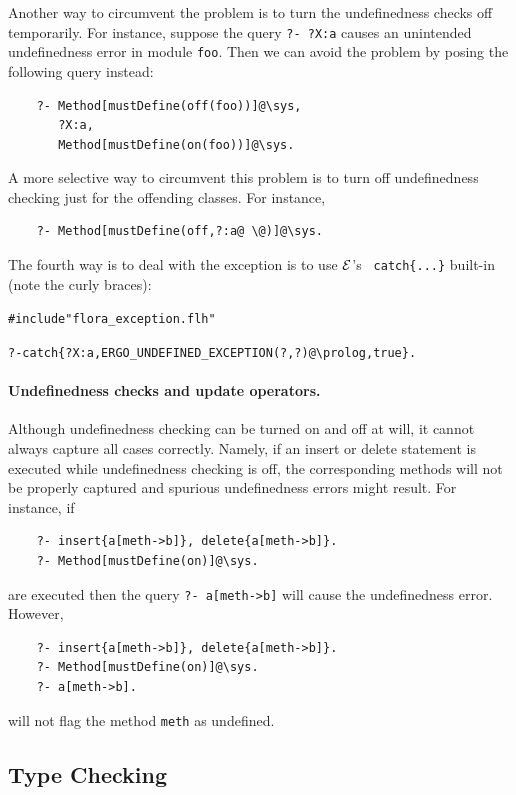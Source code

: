 \documentclass[11pt]{article}
\newcommand{\ERGO}{\mbox{\ensuremath{\cal{E}}\smaller{{\sc{RGO}}}}\xspace}
\newcommand{\FLSYSTEM}{\ERGO}
\newcommand{\FLUNDEFEXCEPTION}{ERGO\_UNDEFINED\_EXCEPTION}
\newcommand{\bs}{\textbackslash}
\begin{document}
Another way to circumvent  the problem is to turn the undefinedness checks
off temporarily. For instance, suppose the query {\tt ?- ?X:a} causes
an unintended undefinedness error in module {\tt foo}. Then we can avoid the
problem by posing the following query instead:
\begin{verbatim}
    ?- Method[mustDefine(off(foo))]@\sys,
       ?X:a,
       Method[mustDefine(on(foo))]@\sys.
\end{verbatim}
A more selective way to circumvent this problem is to turn off
undefinedness checking just for the offending classes. For instance,
\begin{verbatim}
    ?- Method[mustDefine(off,?:a@ \@)]@\sys.
\end{verbatim}

The fourth way is to deal with the exception is to use \FLSYSTEM's {\tt
  catch\{...\}} built-in (note the curly braces):
\begin{alltt}
    #include "flora_exception.flh"

    ?- catch\{?X:a, \FLUNDEFEXCEPTION(?,?)@\bs{}prolog, true\}.
\end{alltt}

\paragraph{Undefinedness checks and update operators.}
Although undefinedness checking can be turned on and off at will, it cannot
always capture all cases correctly. Namely, if an insert or delete
statement is executed while undefinedness checking is off, the
corresponding methods will not be properly captured and spurious
undefinedness errors might result.
For instance, if
\begin{verbatim}
    ?- insert{a[meth->b]}, delete{a[meth->b]}.
    ?- Method[mustDefine(on)]@\sys.
\end{verbatim}
are executed then the query {\tt ?- a[meth->b]} will cause the
undefinedness error. However,
\begin{verbatim}
    ?- insert{a[meth->b]}, delete{a[meth->b]}.
    ?- Method[mustDefine(on)]@\sys.
    ?- a[meth->b].
\end{verbatim}
will not flag the method {\tt meth} as undefined.


\subsection{Type Checking}\label{sec-typechecking}
\end{document}
